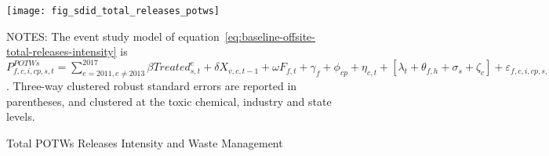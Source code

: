 \begin{figure}[H]
    \centering
    \texttt{[image: fig\_sdid\_total\_releases\_potws]}
    \caption{Total POTWs Releases Intensity and Waste Management}
    \label{fig:baseline-potws-total-releases-intensity}
    \begin{minipage}{12cm}
        \vspace{0.05in}
        NOTES: The event study model of equation~\ref{eq:baseline-offsite-total-releases-intensity} is $P_{f,c,i,cp,s,t}^{POTWs} = \sum_{{e = 2011},{e \neq 2013}}^{2017} \beta Treated_{s,t}^e + \delta X_{v,c,t-1} + \omega F_{f,t} + \gamma_{f} + \phi_{cp} + \eta_{c,t} + \left[\lambda_{t} + \theta_{f,h} + \sigma_{s} + \zeta_{c} \right] + \varepsilon_{f,c,i,cp,s,t}$. Three-way clustered robust standard errors are reported in parentheses, and clustered at the toxic chemical, industry and state levels.
    \end{minipage}
\end{figure}